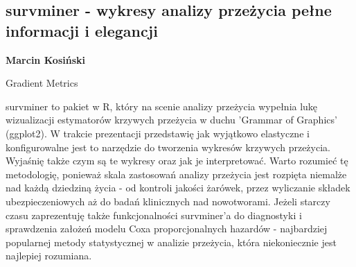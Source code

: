 \documentclass[\main/boa.tex]{subfiles}
\begin{document}
\subsection{survminer - wykresy analizy przeżycia pełne informacji i elegancji}

\begin{minipage}{0.915\textwidth}
	\centering
  {\bf {} Marcin Kosiński}
\end{minipage}


\begin{affiliations}
\begin{minipage}{0.915\textwidth}
\centering
Gradient Metrics \\[-2pt]
\end{minipage}
\end{affiliations}

\vskip 0.3cm

survminer to pakiet w R, który na scenie analizy przeżycia wypełnia lukę wizualizacji estymatorów krzywych przeżycia w duchu 'Grammar of Graphics' (ggplot2). W trakcie prezentacji przedstawię jak wyjątkowo elastyczne i konfigurowalne jest to narzędzie do tworzenia wykresów krzywych przeżycia. Wyjaśnię także czym są te wykresy oraz jak je interpretować. Warto rozumieć tę metodologię, ponieważ skala zastosowań analizy przeżycia jest rozpięta niemalże nad każdą dziedziną życia - od kontroli jakości żarówek, przez wyliczanie składek ubezpieczeniowych aż do badań klinicznych nad nowotworami. Jeżeli starczy czasu zaprezentuję także funkcjonalności survminer'a do diagnostyki i sprawdzenia założeń modelu Coxa proporcjonalnych hazardów - najbardziej popularnej metody statystycznej w analizie przeżycia, która niekoniecznie jest najlepiej rozumiana. 
\end{document}
